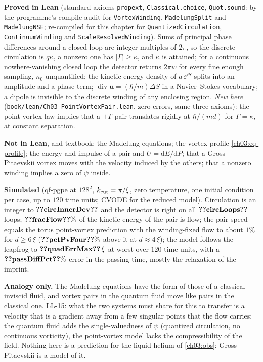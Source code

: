 \begin{honestbox}
\textbf{Proved in Lean} (standard axioms \texttt{propext}, \texttt{Classical.choice}, \texttt{Quot.sound}: by the programme's compile audit for \texttt{VortexWinding}, \texttt{MadelungSplit} and \texttt{MadelungNSE}; re-compiled for this chapter for \texttt{QuantizedCirculation}, \texttt{ContinuumWinding} and \texttt{ScaleResolvedWinding}). Sums of principal phase differences around a closed loop are integer multiples of $2\pi$, so the discrete circulation is $q\kappa$, a nonzero one has $|\Gamma|\ge\kappa$, and $\kappa$ is attained; for a continuous nowhere-vanishing closed loop the detector returns $2\pi w$ for every fine enough sampling, $n_0$ unquantified; the kinetic energy density of $a\,\ee^{\ii S}$ splits into an amplitude and a phase term; $\operatorname{div}\mathbf u=(\hbar/m)\Delta S$ in a Navier--Stokes vocabulary; a dipole is invisible to the discrete winding of any enclosing region. \emph{New here} (\texttt{book/lean/Ch03\_PointVortexPair.lean}, zero errors, same three axioms): the point-vortex law implies that a $\pm\Gamma$ pair translates rigidly at $\hbar/(md)$ for $\Gamma=\kappa$, at constant separation.

\textbf{Not in Lean}, and textbook: the Madelung equations; the vortex profile \eqref{ch03:eq-profile}; the energy and impulse of a pair and $U=\mathrm dE/\mathrm dP$; that a Gross--Pitaevskii vortex moves with the velocity induced by the others; that a nonzero winding implies a zero of $\psi$ inside.

\textbf{Simulated} (qf-pgpe at $128^2$, $k_{\rm cut}=\pi/\xi$, zero temperature, one initial condition per case, up to $120$ time units; CVODE for the reduced model). Circulation is an integer to $\cthreeNum{circInnerDev}$ and the detector is right on all $\cthreeNum{circLoops}$ loops; $\cthreeNum{fracFlow}\%$ of the kinetic energy of the pair is flow; the pair speed equals the torus point-vortex prediction with the winding-fixed flow to about $1\%$ for $d\ge6\,\xi$ ($\cthreeNum{pctPvFour}\%$ above it at $d\approx4\,\xi$); the model follows the leapfrog to $\cthreeNum{quadErrMax}\,\xi$ at worst over $120$ time units, with a $\cthreeNum{passDiffPct}\%$ error in the passing time, mostly the relaxation of the imprint.

\textbf{Analogy only.} The Madelung equations have the form of those of a classical inviscid fluid, and vortex pairs in the quantum fluid move like pairs in the classical one. LL-15: what the two systems must share for this to transfer is a velocity that is a gradient away from a few singular points that the flow carries; the quantum fluid adds the single-valuedness of $\psi$ (quantized circulation, no continuous vorticity), the point-vortex model lacks the compressibility of the field. Nothing here is a prediction for the liquid helium of \cref{ch03:obs}: Gross--Pitaevskii is a model of it.


\end{honestbox}
